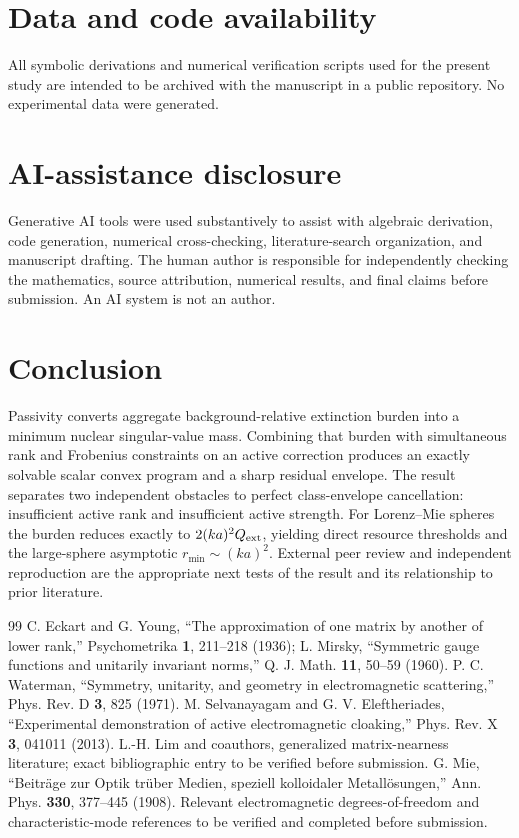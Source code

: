 \documentclass[aps,pra,onecolumn,superscriptaddress,nofootinbib]{revtex4-2}
\begin{document}
\section{Data and code availability}
All symbolic derivations and numerical verification scripts used for the present study are intended to be archived with the manuscript in a public repository. No experimental data were generated.

\section{AI-assistance disclosure}
Generative AI tools were used substantively to assist with algebraic derivation, code generation, numerical cross-checking, literature-search organization, and manuscript drafting. The human author is responsible for independently checking the mathematics, source attribution, numerical results, and final claims before submission. An AI system is not an author.

\section{Conclusion}
Passivity converts aggregate background-relative extinction burden into a minimum nuclear singular-value mass. Combining that burden with simultaneous rank and Frobenius constraints on an active correction produces an exactly solvable scalar convex program and a sharp residual envelope. The result separates two independent obstacles to perfect class-envelope cancellation: insufficient active rank and insufficient active strength. For Lorenz--Mie spheres the burden reduces exactly to $2(ka)^2Q_{\rm ext}$, yielding direct resource thresholds and the large-sphere asymptotic $r_{\min}\sim(ka)^2$. External peer review and independent reproduction are the appropriate next tests of the result and its relationship to prior literature.

\begin{thebibliography}{99}
 C. Eckart and G. Young, ``The approximation of one matrix by another of lower rank,'' Psychometrika \textbf{1}, 211--218 (1936); L. Mirsky, ``Symmetric gauge functions and unitarily invariant norms,'' Q. J. Math. \textbf{11}, 50--59 (1960).
 P. C. Waterman, ``Symmetry, unitarity, and geometry in electromagnetic scattering,'' Phys. Rev. D \textbf{3}, 825 (1971).
 M. Selvanayagam and G. V. Eleftheriades, ``Experimental demonstration of active electromagnetic cloaking,'' Phys. Rev. X \textbf{3}, 041011 (2013).
 L.-H. Lim and coauthors, generalized matrix-nearness literature; exact bibliographic entry to be verified before submission.
 G. Mie, ``Beitr\"age zur Optik tr\"uber Medien, speziell kolloidaler Metall\"osungen,'' Ann. Phys. \textbf{330}, 377--445 (1908).
 Relevant electromagnetic degrees-of-freedom and characteristic-mode references to be verified and completed before submission.
\end{thebibliography}
\end{document}
